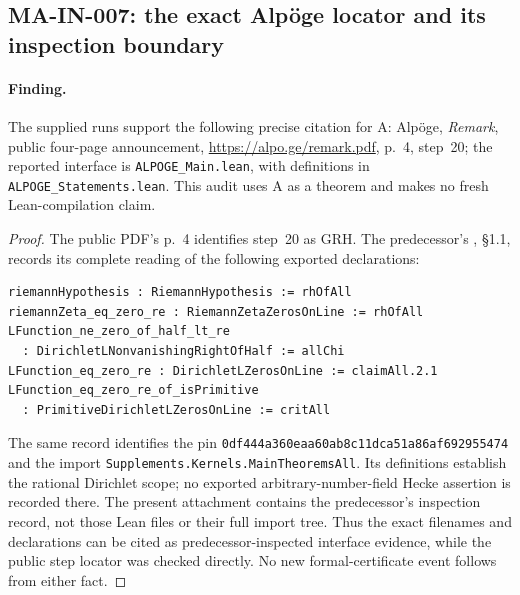 \subsection{MA-IN-007: the exact Alp\"oge locator and its inspection boundary}

\paragraph{Finding.}
The supplied runs support the following precise citation for A:
Alp\"oge, \emph{Remark}, public four-page announcement,
\url{https://alpo.ge/remark.pdf}, p.~4, step~20; the reported interface
is \texttt{ALPOGE\_Main.lean}, with definitions in
\texttt{ALPOGE\_Statements.lean}.  This audit uses A as a theorem and
makes no fresh Lean-compilation claim.

\begin{proof}
The public PDF's p.~4 identifies step~20 as GRH.  The predecessor's
, \S1.1, records its complete
reading of the following exported declarations:
\begin{verbatim}
riemannHypothesis : RiemannHypothesis := rhOfAll
riemannZeta_eq_zero_re : RiemannZetaZerosOnLine := rhOfAll
LFunction_ne_zero_of_half_lt_re
  : DirichletLNonvanishingRightOfHalf := allChi
LFunction_eq_zero_re : DirichletLZerosOnLine := claimAll.2.1
LFunction_eq_zero_re_of_isPrimitive
  : PrimitiveDirichletLZerosOnLine := critAll
\end{verbatim}
The same record identifies the pin
\texttt{0df444a360eaa60ab8c11dca51a86af692955474}
and the import \texttt{Supplements.Kernels.MainTheoremsAll}.
Its definitions establish the rational Dirichlet scope; no exported
arbitrary-number-field Hecke assertion is recorded there.
The present attachment contains the predecessor's inspection record,
not those Lean files or their full import tree.  Thus the exact filenames
and declarations can be cited as predecessor-inspected interface
evidence, while the public step locator was checked directly.  No new
formal-certificate event follows from either fact.
\end{proof}
